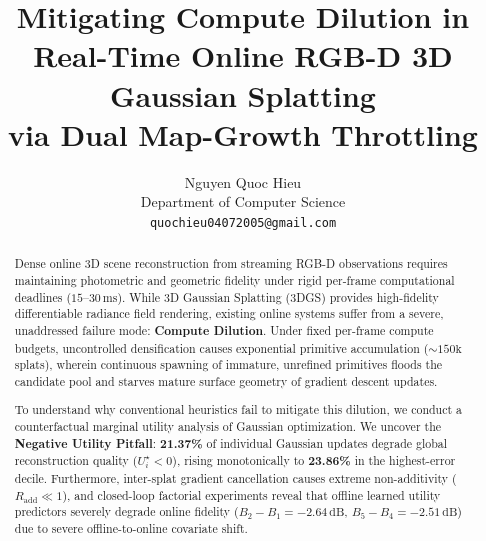 \documentclass[10pt,twocolumn,letterpaper]{article}
\title{\textbf{Mitigating Compute Dilution in Real-Time Online RGB-D 3D Gaussian Splatting\\via Dual Map-Growth Throttling}}
\author{
Nguyen Quoc Hieu\\
Department of Computer Science\\
\texttt{quochieu04072005@gmail.com}
}
\date{}
\begin{document}
\maketitle

\begin{abstract}
Dense online 3D scene reconstruction from streaming RGB-D observations requires maintaining photometric and geometric fidelity under rigid per-frame computational deadlines ($15\text{--}30\,\mathrm{ms}$). While 3D Gaussian Splatting (3DGS) provides high-fidelity differentiable radiance field rendering, existing online systems suffer from a severe, unaddressed failure mode: \textbf{Compute Dilution}. Under fixed per-frame compute budgets, uncontrolled densification causes exponential primitive accumulation ($\sim 150\mathrm{k}$ splats), wherein continuous spawning of immature, unrefined primitives floods the candidate pool and starves mature surface geometry of gradient descent updates.

To understand why conventional heuristics fail to mitigate this dilution, we conduct a counterfactual marginal utility analysis of Gaussian optimization. We uncover the \textbf{Negative Utility Pitfall}: \textbf{21.37\%} of individual Gaussian updates degrade global reconstruction quality ($U_i^\star < 0$), rising monotonically to \textbf{23.86\%} in the highest-error decile. Furthermore, inter-splat gradient cancellation causes extreme non-additivity ($R_{\mathrm{add}} \ll 1$), and closed-loop factorial experiments reveal that offline learned utility predictors severely degrade online fidelity ($B_2 - B_1 = -2.64\,\mathrm{dB}$, $B_5 - B_4 = -2.51\,\mathrm{dB}$) due to severe offline-to-online covariate shift.


\end{abstract}
\end{document}
